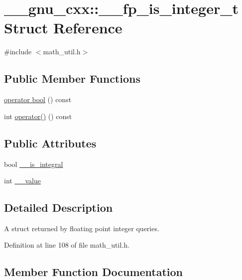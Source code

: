 \hypertarget{struct____gnu__cxx_1_1____fp__is__integer__t}{}\section{\+\_\+\+\_\+gnu\+\_\+cxx\+:\+:\+\_\+\+\_\+fp\+\_\+is\+\_\+integer\+\_\+t Struct Reference}
\label{struct____gnu__cxx_1_1____fp__is__integer__t}


{\ttfamily \#include $<$math\+\_\+util.\+h$>$}

\subsection*{Public Member Functions}
\begin{DoxyCompactItemize}
\item 
\hyperlink{struct____gnu__cxx_1_1____fp__is__integer__t_afc9b00da3136c9a50bec45276c1135c0}{operator bool} () const 
\item 
int \hyperlink{struct____gnu__cxx_1_1____fp__is__integer__t_a3ba89d0930fec5ce584ef39d6bbdde9f}{operator()} () const 
\end{DoxyCompactItemize}
\subsection*{Public Attributes}
\begin{DoxyCompactItemize}
\item 
bool \hyperlink{struct____gnu__cxx_1_1____fp__is__integer__t_a11cf72023d9f2eb1e3982d093de58493}{\+\_\+\+\_\+is\+\_\+integral}
\item 
int \hyperlink{struct____gnu__cxx_1_1____fp__is__integer__t_ad30e10c2e2dc2b23d42b4bbbf5592425}{\+\_\+\+\_\+value}
\end{DoxyCompactItemize}


\subsection{Detailed Description}
A struct returned by floating point integer queries. 

Definition at line 108 of file math\+\_\+util.\+h.



\subsection{Member Function Documentation}
